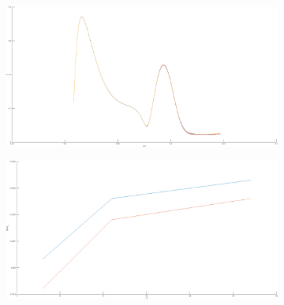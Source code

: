 \begin{center}
\begin{figure}[H]
   \begin{subfigure}{0.45\textwidth}
      \includegraphics[width=\textwidth]{fig/sc_emit_rl}
   \end{subfigure}
   \begin{subfigure}{0.45\textwidth}
      \includegraphics[width=\textwidth]{fig/sc_cvg_rl=3}
   \end{subfigure}


\end{figure}
\end{center}
